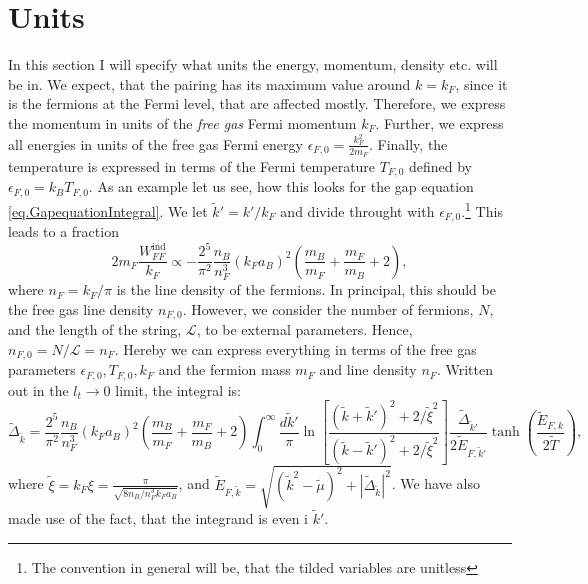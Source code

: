 \section{Units}
In this section I will specify what units the energy, momentum, density etc. will be in. We expect, that the pairing has its maximum value around $k = k_F$, since it is the fermions at the Fermi level, that are affected mostly. Therefore, we express the momentum in units of the \textit{free gas} Fermi momentum $k_F$. Further, we express all energies in units of the free gas Fermi energy $\epsilon_{F,0} = \frac{k_F^2}{2m_F}$. Finally, the temperature is expressed in terms of the Fermi temperature $T_{F,0}$ defined by $\epsilon_{F,0} = k_B T_{F,0}$. As an example let us see, how this looks for the gap equation \eqref{eq.GapequationIntegral}. We let $\tilde{k}' = k'/k_F$ and divide throught with $\epsilon_{F,0}$.\footnote{The convention in general will be, that the tilded variables are unitless} This leads to a fraction
\begin{equation}
2m_F \frac{W_{FF}^\text{ind}}{k_F} \propto -\frac{2^5}{\pi^2}\frac{n_B}{n_F^3}(k_Fa_B)^2\left(\frac{m_B}{m_F} + \frac{m_F}{m_B} + 2\right), \nonumber
\end{equation}
where $n_F = k_F/\pi$ is the line density of the fermions. In principal, this should be the free gas line density $n_{F,0}$. However, we consider the number of fermions, $N$, and the length of the string, $\mathcal{L}$, to be external parameters. Hence, $n_{F,0} = N/\mathcal{L} = n_F$. Hereby we can express everything in terms of the free gas parameters $\epsilon_{F,0}, T_{F,0}, k_F$ and the fermion mass $m_F$ and line density $n_F$. Written out in the $l_t \to 0$ limit, the integral is:
\begin{equation}
\tilde{\Delta}_{\tilde{k}} = \frac{2^5}{\pi^2}\frac{n_B}{n_F^3}(k_Fa_B)^2\left(\frac{m_B}{m_F} + \frac{m_F}{m_B} + 2\right) \int_0^\infty \frac{d\tilde{k}'}{\pi} \ln\left[\frac{(\tilde{k}+\tilde{k}')^2+2/\tilde{\xi}^2}{(\tilde{k}-\tilde{k}')^2+2/\tilde{\xi}^2}\right] \frac{\tilde{\Delta}_{\tilde{k}'}}{2\tilde{E}_{F,\tilde{k}'}}\tanh\left(\frac{\tilde{E}_{F,k}}{2\tilde{T}}\right),
\label{eq.GapequationIntegralUnitless}
\end{equation} 
where $\tilde{\xi} = k_F\xi = \frac{\pi}{\sqrt{8 n_B/n_F^3 k_Fa_B}}$, and $\tilde{E}_{F,\tilde{k}} = \sqrt{(\tilde{k}^2-\tilde{\mu})^2 + |\tilde{\Delta}_{\tilde{k}}|^2}$. We have also made use of the fact, that the integrand is even i $\tilde{k}'$.

